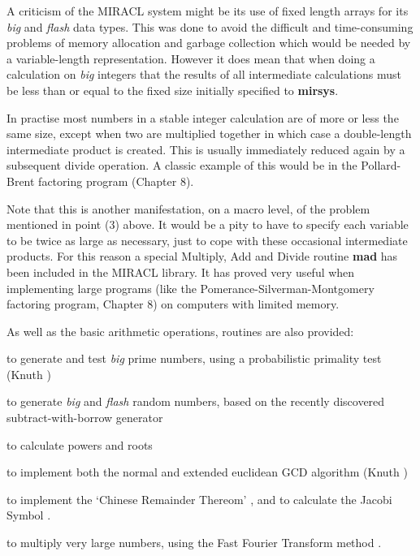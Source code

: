       A  criticism  of  the  MIRACL system might be its use of fixed length 
      arrays for its {\em big} and {\em flash} data types.  This was done to 
      avoid 
      the  difficult  and  time-consuming problems of memory allocation and 
      garbage  collection  which  would  be  needed  by  a  variable-length 
      representation. However it does mean that when doing a calculation on 
      {\em big}  integers  that  the  results of all intermediate calculations 
      must be less than or equal to the fixed size initially  specified  to
      {\bf mirsys}.  

      In practise most numbers in a stable integer calculation are of  more 
      or  less  the  same size,  except when two are multiplied together in 
      which case a double-length intermediate product is created.  This  is 
      usually  immediately  reduced again by a subsequent divide operation.  
      A classic example of this would be  in  the  Pollard-Brent  factoring 
      program (Chapter 8).  

      Note  that  this  is another manifestation, on a macro level,  of the 
      problem mentioned in point (3) above.  It would be a pity to have  to 
      specify each variable to be twice as large as necessary, just to cope 
      with  these  occasional  intermediate  products.  For  this  reason a 
      special Multiply, Add and Divide routine {\bf mad} has been included in 
      the MIRACL library. It has proved very useful when implementing large 
      programs  (like  the  Pomerance-Silverman-Montgomery factoring 
      program, Chapter 8) on computers with limited memory.  

\vspace{5mm}
      As well  as  the  basic  arithmetic  operations,  routines  are  also 
      provided: 


\begin{list}%
{}{}

\item to generate and test {\em big} prime numbers,  using a  probabilistic 
      primality test (Knuth \cite[\$4.5.4]{Knuth81}) 

\item to generate {\em big}  and  {\em flash}  random  numbers,  based  on the 
      recently discovered subtract-with-borrow generator \cite{Marsaglia} 

\item to calculate powers and roots

\item to implement both the normal and extended euclidean GCD algorithm 
      (Knuth \cite[\$4.5.2]{Knuth81}) 

\item to implement the `Chinese Remainder Thereom' \cite{Knuth81}, and to 
      calculate the Jacobi Symbol \cite{Reisel}.

\item to multiply very large numbers, using the Fast Fourier Transform method
      \cite{Pollard}.

\end{list}

